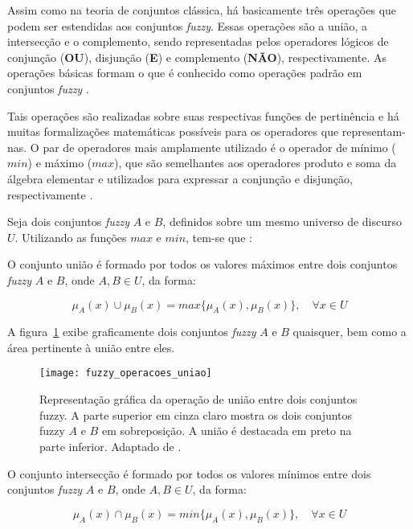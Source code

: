 Assim como na teoria de conjuntos clássica, há basicamente três operações que podem ser estendidas aos conjuntos \emph{fuzzy}. Essas operações são a união, a intersecção e o complemento, sendo representadas pelos operadores lógicos de conjunção (\textbf{OU}), disjunção (\textbf{E}) e complemento (\textbf{NÃO}), respectivamente. As operações básicas formam o que é conhecido como operações padrão em conjuntos \emph{fuzzy} \citep{klir:95}.

Tais operações são realizadas sobre suas respectivas funções de pertinência e há muitas formalizações matemáticas possíveis para os operadores que representam-nas. O par de operadores mais amplamente utilizado é o operador de mínimo ($min$) e máximo ($max$), que são semelhantes aos operadores produto e soma da álgebra elementar e utilizados para expressar a conjunção e disjunção, respectivamente \citep{thole:79}.

Seja dois conjuntos \emph{fuzzy} $A$ e $B$, definidos sobre um mesmo universo de discurso $U$. Utilizando as funções $max$ e $min$, tem-se que \citep{klir:95}:

\begin{defn}
\label{def:conjunto_fuzzy_uniao}
O conjunto união é formado por todos os valores máximos entre dois conjuntos \emph{fuzzy} $A$ e $B$, onde $A, B \in U$, da forma:

\begin{equation}
  \mu_A(x) \cup \mu_B(x) = max\{\mu_A(x), \mu_B(x)\}, \quad \forall x \in U
\end{equation}
\end{defn}

A figura~\ref{fig:fuzzy_operacoes_uniao} exibe graficamente dois conjuntos \emph{fuzzy} $A$ e $B$ quaisquer, bem como a área pertinente à união entre eles.

\begin{figure}[!h]
  \centering
  \texttt{[image: fuzzy\_operacoes\_uniao]}
  \caption[Operação de união entre dois conjuntos \emph{fuzzy}]{Representação gráfica da operação de união entre dois conjuntos fuzzy. A parte superior em cinza claro mostra os dois conjuntos fuzzy $A$ e $B$ em sobreposição. A união é destacada em preto na parte inferior. Adaptado de \citet{vrusias:06}.}
  \label{fig:fuzzy_operacoes_uniao}
\end{figure}

\begin{defn}
\label{def:conjunto_fuzzy_interseccao}
O conjunto intersecção é formado por todos os valores mínimos entre dois conjuntos \emph{fuzzy} $A$ e $B$, onde $A, B \in U$, da forma:

\begin{equation}
  \mu_A(x) \cap \mu_B(x) = min\{\mu_A(x), \mu_B(x)\}, \quad \forall x \in U
\end{equation}
\end{defn}

